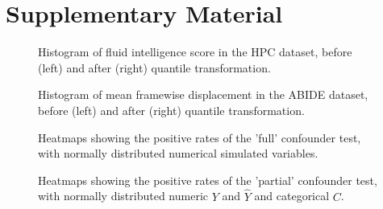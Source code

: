 \section{Supplementary Material}
\beginsupplement

\begin{figure}[H]
  \centering
  \caption{Histogram of fluid intelligence score in the HPC dataset, before (left) and after (right) quantile transformation.}
  \label{fig:hcp-hist}
\end{figure}

\begin{figure}[H]
  \centering
  \caption{Histogram of mean framewise displacement in the ABIDE dataset, before (left) and after (right) quantile transformation.}
  \label{fig:abide-hist}
\end{figure}

\begin{figure}[H]
  \centering
  \caption{Heatmaps showing the positive rates of the 'full' confounder test, with normally distributed numerical simulated variables.}
  \label{fig:sim-ccc-full}
\end{figure}


\begin{figure}[H]
  \centering
  \caption{Heatmaps showing the positive rates of the 'partial' confounder test, with normally distributed numeric $Y$ and $\hat{Y}$ and categorical $C$.}
  \label{fig:sim-ccb-partial}
\end{figure}